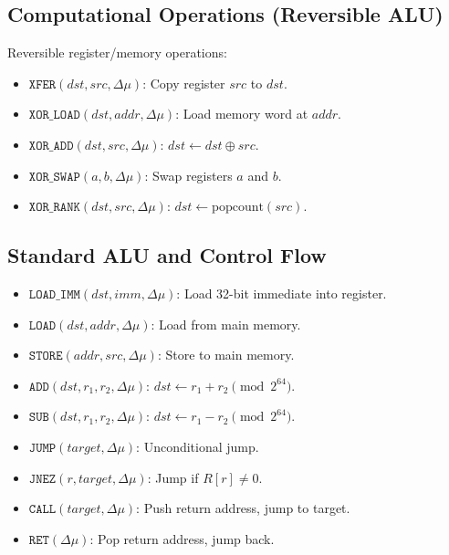 \documentclass[11pt, a4paper]{report}
\theoremstyle{definition}
\theoremstyle{plain}
\begin{document}
\subsection{Computational Operations (Reversible ALU)}
Reversible register/memory operations:
\begin{itemize}
    \item $\texttt{XFER}(\mathit{dst}, \mathit{src}, \Delta\mu)$: Copy register $\mathit{src}$ to $\mathit{dst}$.
    \item $\texttt{XOR\_LOAD}(\mathit{dst}, \mathit{addr}, \Delta\mu)$: Load memory word at $\mathit{addr}$.
    \item $\texttt{XOR\_ADD}(\mathit{dst}, \mathit{src}, \Delta\mu)$: $\mathit{dst} \gets \mathit{dst} \oplus \mathit{src}$.
    \item $\texttt{XOR\_SWAP}(a, b, \Delta\mu)$: Swap registers $a$ and $b$.
    \item $\texttt{XOR\_RANK}(\mathit{dst}, \mathit{src}, \Delta\mu)$: $\mathit{dst} \gets \mathrm{popcount}(\mathit{src})$.
\end{itemize}

\subsection{Standard ALU and Control Flow}
\begin{itemize}
    \item $\texttt{LOAD\_IMM}(\mathit{dst}, \mathit{imm}, \Delta\mu)$: Load 32-bit immediate into register.
    \item $\texttt{LOAD}(\mathit{dst}, \mathit{addr}, \Delta\mu)$: Load from main memory.
    \item $\texttt{STORE}(\mathit{addr}, \mathit{src}, \Delta\mu)$: Store to main memory.
    \item $\texttt{ADD}(\mathit{dst}, r_1, r_2, \Delta\mu)$: $\mathit{dst} \gets r_1 + r_2 \pmod{2^{64}}$.
    \item $\texttt{SUB}(\mathit{dst}, r_1, r_2, \Delta\mu)$: $\mathit{dst} \gets r_1 - r_2 \pmod{2^{64}}$.
    \item $\texttt{JUMP}(\mathit{target}, \Delta\mu)$: Unconditional jump.
    \item $\texttt{JNEZ}(r, \mathit{target}, \Delta\mu)$: Jump if $R[r] \neq 0$.
    \item $\texttt{CALL}(\mathit{target}, \Delta\mu)$: Push return address, jump to target.
    \item $\texttt{RET}(\Delta\mu)$: Pop return address, jump back.
\end{itemize}
\end{document}
